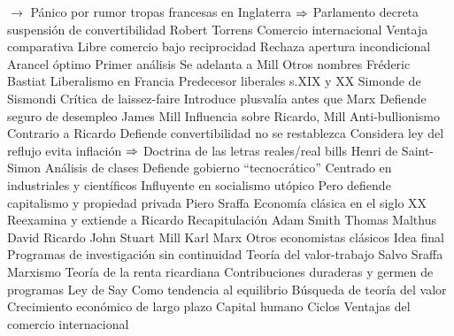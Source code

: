\documentclass{nuevotema}
\begin{document}
\begin{esquemal}
				\4[] $\to$ Pánico por rumor tropas francesas en Inglaterra
				\4[] $\Rightarrow$ Parlamento decreta suspensión de convertibilidad
		\2 Robert Torrens
			\3 Comercio internacional
				\4 Ventaja comparativa
				\4 Libre comercio bajo reciprocidad
				\4[] Rechaza apertura incondicional
			\3 Arancel óptimo
				\4 Primer análisis
				\4 Se adelanta a Mill
		\2 Otros nombres
			\3 Fréderic Bastiat
				\4 Liberalismo en Francia
				\4 Predecesor liberales s.XIX y XX
			\3 Simonde de Sismondi
				\4 Crítica de laissez-faire
				\4 Introduce plusvalía antes que Marx
				\4 Defiende seguro de desempleo
			\3 James Mill
				\4 Influencia sobre Ricardo, Mill
				\4 Anti-bullionismo
				\4[] Contrario a Ricardo
				\4[] Defiende convertibilidad no se restablezca
				\4[] Considera ley del reflujo evita inflación
				\4[] $\Rightarrow$ Doctrina de las letras reales/real bills
			\3 Henri de Saint-Simon
				\4 Análisis de clases
				\4 Defiende gobierno ``tecnocrático''
				\4[] Centrado en industriales y científicos
				\4 Influyente en socialismo utópico
				\4[] Pero defiende capitalismo y propiedad privada
			\3 Piero Sraffa
				\4 Economía clásica en el siglo XX
				\4 Reexamina y extiende a Ricardo
	\1[] 
		\2 Recapitulación
			\3 Adam Smith
			\3 Thomas Malthus
			\3 David Ricardo
			\3 John Stuart Mill
			\3 Karl Marx
			\3 Otros economistas clásicos
		\2 Idea final
			\3 Programas de investigación sin continuidad
				\4 Teoría del valor-trabajo
				\4[] Salvo Sraffa
				\4 Marxismo
				\4 Teoría de la renta ricardiana
			\3 Contribuciones duraderas y germen de programas
				\4 Ley de Say
				\4[] Como tendencia al equilibrio
				\4 Búsqueda de teoría del valor
				\4 Crecimiento económico de largo plazo
				\4 Capital humano
				\4 Ciclos
				\4 Ventajas del comercio internacional
\end{esquemal}
\end{document}
